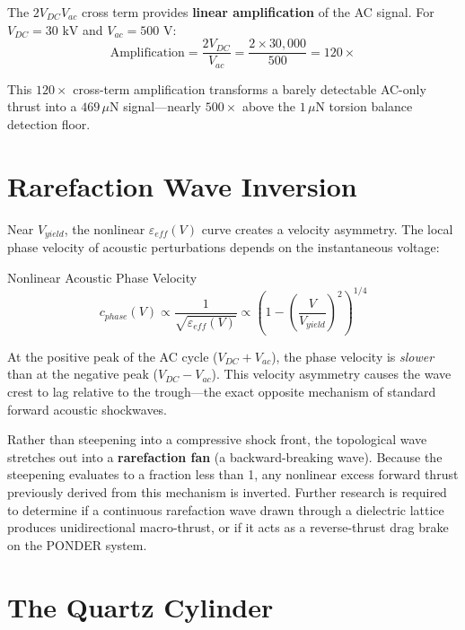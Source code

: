 The $2V_{DC}V_{ac}$ cross term provides \textbf{linear amplification} of the AC signal. For $V_{DC} = 30\text{ kV}$ and $V_{ac} = 500\text{ V}$:
\begin{equation}
    \text{Amplification} = \frac{2V_{DC}}{V_{ac}} = \frac{2 \times 30{,}000}{500} = 120\times
\end{equation}

This $120\times$ cross-term amplification transforms a barely detectable AC-only thrust into a $469\,\mu\text{N}$ signal---nearly $500\times$ above the $1\,\mu\text{N}$ torsion balance detection floor.

\section{Rarefaction Wave Inversion}

Near $V_{yield}$, the nonlinear $\varepsilon_{eff}(V)$ curve creates a velocity asymmetry. The local phase velocity of acoustic perturbations depends on the instantaneous voltage:
\begin{resultbox}{Nonlinear Acoustic Phase Velocity}
\begin{equation}
    c_{phase}(V) \propto \frac{1}{\sqrt{\varepsilon_{eff}(V)}} \propto \left(1 - \left(\frac{V}{V_{yield}}\right)^2\right)^{1/4}
\end{equation}
\end{resultbox}

At the positive peak of the AC cycle ($V_{DC} + V_{ac}$), the phase velocity is \textit{slower} than at the negative peak ($V_{DC} - V_{ac}$). This velocity asymmetry causes the wave crest to lag relative to the trough---the exact opposite mechanism of standard forward acoustic shockwaves.

Rather than steepening into a compressive shock front, the topological wave stretches out into a \textbf{rarefaction fan} (a backward-breaking wave). Because the steepening evaluates to a fraction less than 1, any nonlinear excess forward thrust previously derived from this mechanism is inverted. Further research is required to determine if a continuous rarefaction wave drawn through a dielectric lattice produces unidirectional macro-thrust, or if it acts as a reverse-thrust drag brake on the PONDER system.

\section{The Quartz Cylinder}

